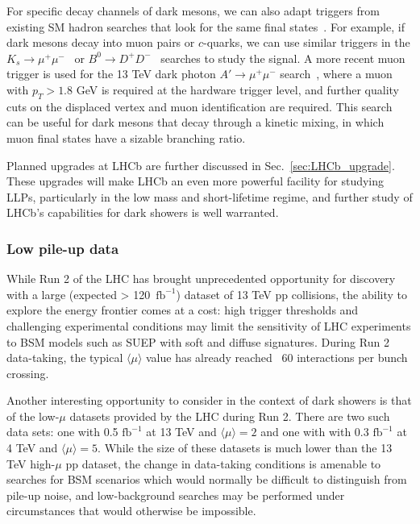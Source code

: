 For specific decay channels of dark mesons, we can also adapt triggers from  existing SM hadron searches that look for the same  final states~\cite{Pierce:2017taw}. For example, if dark mesons decay into muon pairs or $c$-quarks, we can use similar triggers in the $K_s\to\mu^+\mu^-$~\cite{Aaij:2012rt} or $B^0\to D^+D^-$~\cite{Aaij:2016yip} searches to study the signal. A more recent muon trigger is used for the 13 TeV dark photon $A'\to\mu^+\mu^-$ search~\cite{Aaij:2017rft}, where a muon with $p_T>1.8$ GeV is required at the hardware trigger level, and further quality cuts on the displaced vertex and muon identification are required. This search can be useful for dark mesons that decay through a kinetic mixing, in which muon final states have a sizable branching ratio.

Planned upgrades at LHCb are further discussed in Sec.~\ref{sec:LHCb_upgrade}.   These upgrades will make LHCb an even more powerful facility for studying LLPs, particularly in the low mass and short-lifetime regime, and further study of LHCb's capabilities for dark showers is well warranted.  

\subsubsection{Low pile-up data}

While Run 2 of the LHC has brought unprecedented opportunity for discovery with a large (expected > \mbox{120 $\text{fb}^{-1}$}) dataset of 13 TeV pp collisions, the ability to explore the energy frontier comes at a cost: high trigger thresholds and challenging experimental conditions may limit the sensitivity of LHC experiments to BSM models such as SUEP with soft and diffuse signatures. During Run 2 data-taking, the typical $\langle \mu\rangle$ value has already reached ~60 interactions per bunch crossing.

Another interesting opportunity to consider in the context of dark showers is that of the low-$\mu$ datasets provided by the LHC during Run 2. There are two such data sets: one with 0.5 $\text{fb}^{-1}$ at 13 TeV and  $\langle\mu\rangle=2$ and one with with 0.3 $\text{fb}^{-1}$ at 4 TeV and  $\langle\mu\rangle=5$. While the size of these datasets is much lower than the 13 TeV high-$\mu$ pp dataset, the change in data-taking conditions is amenable to searches for BSM scenarios which would normally be difficult to distinguish from pile-up noise, and low-background searches may be performed under circumstances that would otherwise be impossible.

